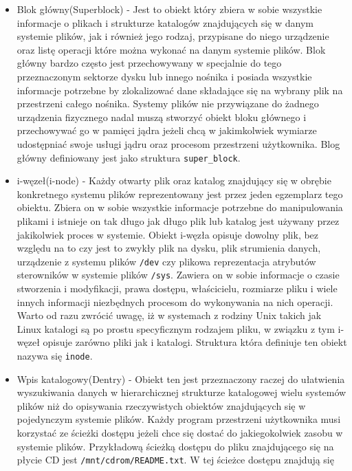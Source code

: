 \begin{itemize}
\item
  Blok główny(Superblock) - Jest to obiekt który zbiera w sobie
  wszystkie informacje o plikach i strukturze katalogów znajdujących się
  w danym systemie plików, jak i również jego rodzaj, przypisane do
  niego urządzenie oraz listę operacji które można wykonać na danym
  systemie plików. Blok główny bardzo często jest przechowywany w
  specjalnie do tego przeznaczonym sektorze dysku lub innego nośnika i
  posiada wszystkie informacje potrzebne by zlokalizować dane składające
  się na wybrany plik na przestrzeni całego nośnika. Systemy plików nie
  przywiązane do żadnego urządzenia fizycznego nadal muszą stworzyć
  obiekt bloku głównego i przechowywać go w pamięci jądra jeżeli chcą w
  jakimkolwiek wymiarze udostępniać swoje usługi jądru oraz procesom
  przestrzeni użytkownika. Blog główny definiowany jest jako struktura
  \texttt{super\_block}.
\item
  i-węzeł(i-node) - Każdy otwarty plik oraz katalog znajdujący się w
  obrębie konkretnego systemu plików reprezentowany jest przez jeden
  egzemplarz tego obiektu. Zbiera on w sobie wszystkie informacje
  potrzebne do manipulowania plikami i istnieje on tak długo jak długo
  plik lub katalog jest używany przez jakikolwiek proces w systemie.
  Obiekt i-węzła opisuje dowolny plik, bez względu na to czy jest to
  zwykły plik na dysku, plik strumienia danych, urządzenie z systemu
  plików \texttt{/dev} czy plikowa reprezentacja atrybutów sterowników w
  systemie plików \texttt{/sys}. Zawiera on w sobie informacje o czasie
  stworzenia i modyfikacji, prawa dostępu, właścicielu, rozmiarze pliku
  i wiele innych informacji niezbędnych procesom do wykonywania na nich
  operacji. Warto od razu zwrócić uwagę, iż w systemach z rodziny Unix
  takich jak Linux katalogi są po prostu specyficznym rodzajem pliku, w
  związku z tym i-węzeł opisuje zarówno pliki jak i katalogi. Struktura
  która definiuje ten obiekt nazywa się \texttt{inode}.
\item
  Wpis katalogowy(Dentry) - Obiekt ten jest przeznaczony raczej do
  ułatwienia wyszukiwania danych w hierarchicznej strukturze katalogowej
  wielu systemów plików niż do opisywania rzeczywistych obiektów
  znajdujących się w pojedynczym systemie plików. Każdy program
  przestrzeni użytkownika musi korzystać ze ścieżki dostępu jeżeli chce
  się dostać do jakiegokolwiek zasobu w systemie plików. Przykładową
  ścieżką dostępu do pliku znajdującego się na płycie CD jest
  \texttt{/mnt/cdrom/README.txt}. W tej ścieżce dostępu znajdują się

\end{itemize}
